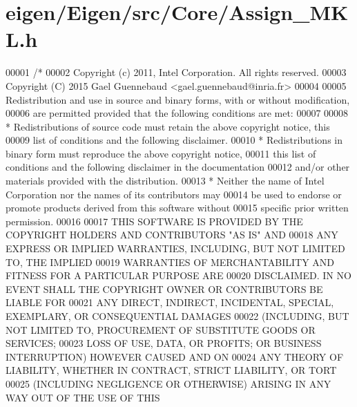 \hypertarget{eigen_2_eigen_2src_2_core_2_assign___m_k_l_8h_source}{}\section{eigen/\+Eigen/src/\+Core/\+Assign\+\_\+\+M\+KL.h}
\label{eigen_2_eigen_2src_2_core_2_assign___m_k_l_8h_source}

\begin{DoxyCode}
00001 \textcolor{comment}{/*}
00002 \textcolor{comment}{ Copyright (c) 2011, Intel Corporation. All rights reserved.}
00003 \textcolor{comment}{ Copyright (C) 2015 Gael Guennebaud <gael.guennebaud@inria.fr>}
00004 \textcolor{comment}{ }
00005 \textcolor{comment}{ Redistribution and use in source and binary forms, with or without modification,}
00006 \textcolor{comment}{ are permitted provided that the following conditions are met:}
00007 \textcolor{comment}{}
00008 \textcolor{comment}{ * Redistributions of source code must retain the above copyright notice, this}
00009 \textcolor{comment}{   list of conditions and the following disclaimer.}
00010 \textcolor{comment}{ * Redistributions in binary form must reproduce the above copyright notice,}
00011 \textcolor{comment}{   this list of conditions and the following disclaimer in the documentation}
00012 \textcolor{comment}{   and/or other materials provided with the distribution.}
00013 \textcolor{comment}{ * Neither the name of Intel Corporation nor the names of its contributors may}
00014 \textcolor{comment}{   be used to endorse or promote products derived from this software without}
00015 \textcolor{comment}{   specific prior written permission.}
00016 \textcolor{comment}{}
00017 \textcolor{comment}{ THIS SOFTWARE IS PROVIDED BY THE COPYRIGHT HOLDERS AND CONTRIBUTORS "AS IS" AND}
00018 \textcolor{comment}{ ANY EXPRESS OR IMPLIED WARRANTIES, INCLUDING, BUT NOT LIMITED TO, THE IMPLIED}
00019 \textcolor{comment}{ WARRANTIES OF MERCHANTABILITY AND FITNESS FOR A PARTICULAR PURPOSE ARE}
00020 \textcolor{comment}{ DISCLAIMED. IN NO EVENT SHALL THE COPYRIGHT OWNER OR CONTRIBUTORS BE LIABLE FOR}
00021 \textcolor{comment}{ ANY DIRECT, INDIRECT, INCIDENTAL, SPECIAL, EXEMPLARY, OR CONSEQUENTIAL DAMAGES}
00022 \textcolor{comment}{ (INCLUDING, BUT NOT LIMITED TO, PROCUREMENT OF SUBSTITUTE GOODS OR SERVICES;}
00023 \textcolor{comment}{ LOSS OF USE, DATA, OR PROFITS; OR BUSINESS INTERRUPTION) HOWEVER CAUSED AND ON}
00024 \textcolor{comment}{ ANY THEORY OF LIABILITY, WHETHER IN CONTRACT, STRICT LIABILITY, OR TORT}
00025 \textcolor{comment}{ (INCLUDING NEGLIGENCE OR OTHERWISE) ARISING IN ANY WAY OUT OF THE USE OF THIS}

\end{DoxyCode}
